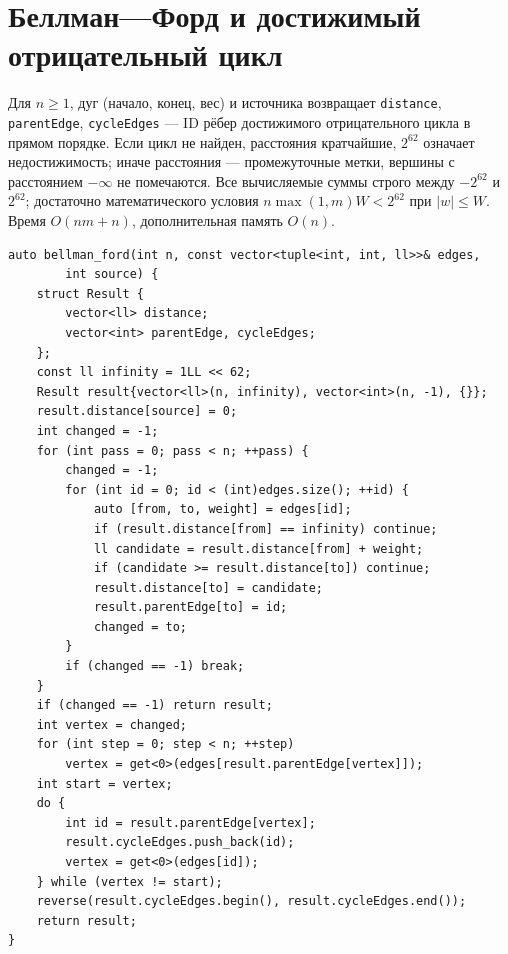 \section{Беллман---Форд и достижимый отрицательный цикл}
Для $n\ge1$, дуг (начало, конец, вес) и источника возвращает \texttt{distance}, \texttt{parentEdge}, \texttt{cycleEdges} --- ID рёбер достижимого отрицательного цикла в прямом порядке.
Если цикл не найден, расстояния кратчайшие, $2^{62}$ означает недостижимость; иначе расстояния --- промежуточные метки, вершины с расстоянием $-\infty$ не помечаются.
Все вычисляемые суммы строго между $-2^{62}$ и $2^{62}$; достаточно математического условия $n\max(1,m)W<2^{62}$ при $|w|\le W$.
Время $O(nm+n)$, дополнительная память $O(n)$.
\begin{lstlisting}[name=extra_graph_bellman_ford]
auto bellman_ford(int n, const vector<tuple<int, int, ll>>& edges,
        int source) {
    struct Result {
        vector<ll> distance;
        vector<int> parentEdge, cycleEdges;
    };
    const ll infinity = 1LL << 62;
    Result result{vector<ll>(n, infinity), vector<int>(n, -1), {}};
    result.distance[source] = 0;
    int changed = -1;
    for (int pass = 0; pass < n; ++pass) {
        changed = -1;
        for (int id = 0; id < (int)edges.size(); ++id) {
            auto [from, to, weight] = edges[id];
            if (result.distance[from] == infinity) continue;
            ll candidate = result.distance[from] + weight;
            if (candidate >= result.distance[to]) continue;
            result.distance[to] = candidate;
            result.parentEdge[to] = id;
            changed = to;
        }
        if (changed == -1) break;
    }
    if (changed == -1) return result;
    int vertex = changed;
    for (int step = 0; step < n; ++step)
        vertex = get<0>(edges[result.parentEdge[vertex]]);
    int start = vertex;
    do {
        int id = result.parentEdge[vertex];
        result.cycleEdges.push_back(id);
        vertex = get<0>(edges[id]);
    } while (vertex != start);
    reverse(result.cycleEdges.begin(), result.cycleEdges.end());
    return result;
}
\end{lstlisting}
